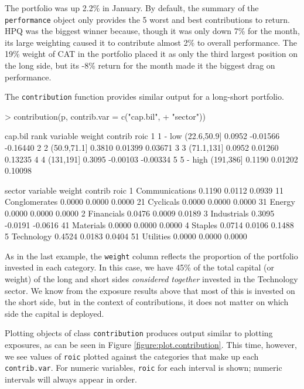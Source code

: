 \documentclass[a4paper]{report}
\begin{document}
\begin{article}
The portfolio was up 2.2\% in January. By default, the summary of the
\texttt{performance} object only provides the 5 worst and best
contributions to return. HPQ was the biggest winner because, though it
was only down 7\% for the month, its large weighting caused it to
contribute almost 2\% to overall performance. The 19\% weight of CAT
in the portfolio placed it as only the third largest position on the
long side, but its -8\% return for the month made it the biggest drag
on performance.

The \texttt{contribution} function provides similar output for a
long-short portfolio.

\begin{Schunk}
\begin{Sinput}
> contribution(p, contrib.var = c("cap.bil", 
+     "sector"))
\end{Sinput}
\begin{Soutput}
cap.bil 
      rank    variable weight  contrib     roic
1  1 - low (22.6,50.9] 0.0952 -0.01566 -0.16440
2        2 (50.9,71.1] 0.3810  0.01399  0.03671
3        3  (71.1,131] 0.0952  0.01260  0.13235
4        4   (131,191] 0.3095 -0.00103 -0.00334
5 5 - high   (191,386] 0.1190  0.01202  0.10098

sector 
         variable weight contrib    roic
1  Communications 0.1190  0.0112  0.0939
11  Conglomerates 0.0000  0.0000  0.0000
21      Cyclicals 0.0000  0.0000  0.0000
31         Energy 0.0000  0.0000  0.0000
2      Financials 0.0476  0.0009  0.0189
3     Industrials 0.3095 -0.0191 -0.0616
41      Materials 0.0000  0.0000  0.0000
4         Staples 0.0714  0.0106  0.1488
5      Technology 0.4524  0.0183  0.0404
51      Utilities 0.0000  0.0000  0.0000
\end{Soutput}
\end{Schunk}

As in the last example, the \texttt{weight} column reflects the
proportion of the portfolio invested in each category.  In this case,
we have 45\% of the total capital (or weight) of the long and short
sides \emph{considered together} invested in the Technology sector. We
know from the exposure results above that most of this is invested on
the short side, but in the context of contributions, it does not
matter on which side the capital is deployed.

Plotting objects of class \texttt{contribution} produces output
similar to plotting exposures, as can be seen in Figure
\ref{figure:plot.contribution}.  This time, however, we see values of
\texttt{roic} plotted against the categories that make up each
\texttt{contrib.var}.  For numeric variables, \texttt{roic} for each
interval is shown; numeric intervals will always appear in order.


\end{article}
\end{document}
